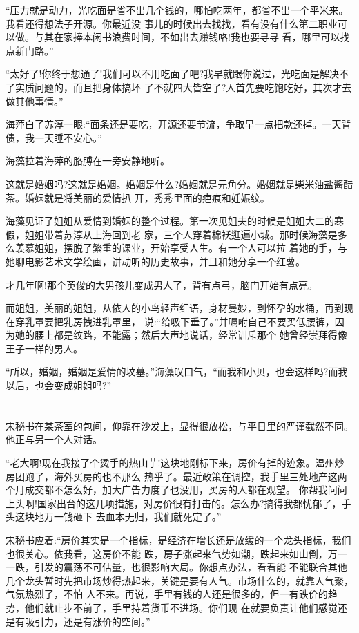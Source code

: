 \documentclass[11pt,a4paper,onecolumn]{article}
\begin{document}
``压力就是动力，光吃面是省不出几个钱的，哪怕吃两年，都省不出一个平米来。我看还得想法子开源。你最近没
事儿的时候出去找找，看有没有什么第二职业可以做。与其在家捧本闲书浪费时间，不如出去赚钱咯!我也要寻寻
看，哪里可以找点新门路。''

``太好了!你终于想通了!我们可以不用吃面了吧?我早就跟你说过，光吃面是解决不了实质问题的，而且把身体搞坏
了不就四大皆空了?人首先要吃饱吃好，其次才去做其他事情。''

海萍白了苏淳一眼:``面条还是要吃，开源还要节流，争取早一点把款还掉。一天背债，我一天睡不安心。''

海藻拉着海萍的胳膊在一旁安静地听。

这就是婚姻吗?这就是婚姻。婚姻是什么?婚姻就是元角分。婚姻就是柴米油盐酱醋茶。婚姻就是将美丽的爱情扒
开，秀秀里面的疤痕和妊娠纹。

海藻见证了姐姐从爱情到婚姻的整个过程。第一次见姐夫的时候是姐姐大二的寒假，姐姐带着苏淳从上海回到老
家，三个人穿着棉袄逛遍小城。那时候海藻是多么羡慕姐姐，摆脱了繁重的课业，开始享受人生。有一个人可以拉
着她的手，与她聊电影艺术文学绘画，讲动听的历史故事，并且和她分享一个红薯。

才几年啊!那个英俊的大男孩儿变成男人了，背有点弓，脑门开始有点亮。

而姐姐，美丽的姐姐，从依人的小鸟轻声细语，身材曼妙，到怀孕的水桶，再到现在穿乳罩要把乳房拽进乳罩里，
说:``给吸下垂了。''并嘱咐自己不要买低腰裤，因为她的腰上都是纹路，不能露；然后大声地说话，经常训斥那个
她曾经崇拜得像王子一样的男人。

``所以，婚姻，婚姻是爱情的坟墓。''海藻叹口气，``而我和小贝，也会这样吗?而我以后，也会变成姐姐吗?''

\section[\thesection]{}

宋秘书在某茶室的包间，仰靠在沙发上，显得很放松，与平日里的严谨截然不同。他正与另一个人对话。

``老大啊!现在我接了个烫手的热山芋!这块地刚标下来，房价有掉的迹象。温州炒房团跑了，海外买房的也不那么
热乎了。最近政策在调控，我手里三处地产这两个月成交都不怎么好，加大广告力度了也没用，买房的人都在观望。
你帮我问问上头啊!国家出台的这几项措施，对房价很有打击的。怎么办?搞得我都忧郁了，手头这块地万一钱砸下
去血本无归，我们就死定了。''

宋秘书应着:``房价其实是一个指标，是经济在增长还是放缓的一个龙头指标，我们也很关心。依我看，这房价不能
跌，房子涨起来气势如潮，跌起来如山倒，万一一跌，引发的震荡不可估量，也很影响大局。你想点办法，看看能
不能联合其他几个龙头暂时先把市场炒得热起来，关键是要有人气。市场什么的，就靠人气聚，气氛热烈了，不怕
人不来。再说，手里有钱的人还是很多的，但一有跌价的趋势，他们就止步不前了，手里持着货币不进场。你们现
在就要负责让他们感觉还是有吸引力，还是有涨价的空间。''
\end{document}
